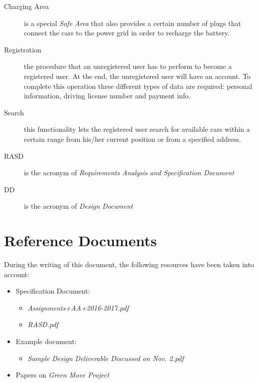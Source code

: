 \documentclass[11pt,a4paper]{report}
\begin{document}
\begin{description}
\item[Charging Area] is a special \textit{Safe Area} that also provides a certain number of plugs that connect the cars to the power grid in order to recharge the battery.
\item[Registration] the procedure that an unregistered user has to perform to become a registered user. At the end, the unregistered user will have an account. To complete this operation three different types of data are required: personal information, driving license number and payment info.
\item[Search] this functionality lets the registered user search for available cars within a certain range from his/her current position or from a specified address.
\item[RASD] is the acronym of \textit{Requirements Analysis and Specification Document}
\item[DD] is the acronym of \textit{Design Document}
\end{description}

\section{Reference Documents}
During the writing of this document, the following resources have been taken into account:
\begin{itemize}
	\item Specification Document:
	\begin{itemize}
		\item \textit{Assignments+AA+2016-2017.pdf}
		\item \textit{RASD.pdf}
	\end{itemize}
	\item Example document:
	\begin{itemize}
		\item \textit{Sample Design Deliverable Discussed on Nov. 2.pdf}
	\end{itemize}
	\item Papers on \textit{Green Move Project}
\end{itemize}
\end{document}
